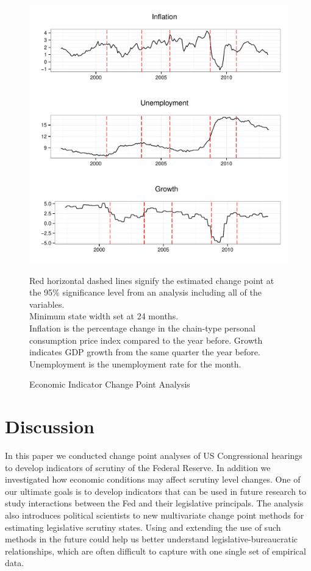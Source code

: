 \documentclass[a4paper]{article}\usepackage[]{graphicx}\usepackage[]{color}
\newenvironment{knitrout}{}{} %
\begin{document}
\begin{figure}
    \caption{Economic Indicator Change Point Analysis}
    \label{fig:FullEconCP}
\begin{knitrout}
\color{fgcolor}

{\centering \includegraphics[width=0.8\linewidth]{figure/EconFullCP} 

}



\end{knitrout}
{\scriptsize{Red horizontal dashed lines signify the estimated change point at the 95\% significance level from an analysis including all of the variables.\\
Minimum state width set at 24 months. \\
Inflation is the percentage change in the chain-type personal consumption price index compared to the year before. Growth indicates GDP growth from the same quarter the year before. Unemployment is the unemployment rate for the month.}}
\end{figure}


\section{Discussion}

In this paper we conducted change point analyses of US Congressional hearings to develop indicators of scrutiny of the Federal Reserve. In addition we investigated how economic conditions may affect scrutiny level changes. One of our ultimate goals is to develop indicators that can be used in future research to study interactions between the Fed and their legislative principals. The analysis also introduces political scientists to new multivariate change point methods for estimating legislative scrutiny states. Using and extending the use of such methods in the future could help us better understand legislative-bureaucratic relationships, which are often difficult to capture with one single set of empirical data.
\end{document}
